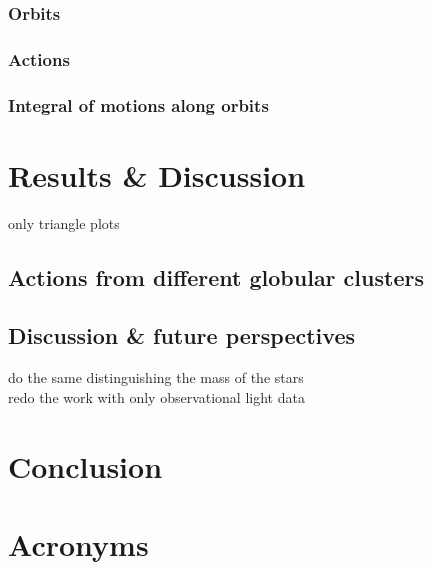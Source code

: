 \documentclass[a4paper,12pt,abstracton]{scrartcl}
\begin{document}
\subsubsection{Orbits}
\subsubsection{Actions}
\subsubsection{Integral of motions along orbits}
\newpage
\section{Results \& Discussion}
only triangle plots

\subsection{Actions from different globular clusters}
\subsection{Discussion \& future perspectives}
do the same distinguishing the mass of the stars\\
redo the work with only observational light data
\newpage
\section{Conclusion}
\newpage 
\section{Acronyms}

\begin{acronym}[SMBH]
\end{acronym}
\end{document}
